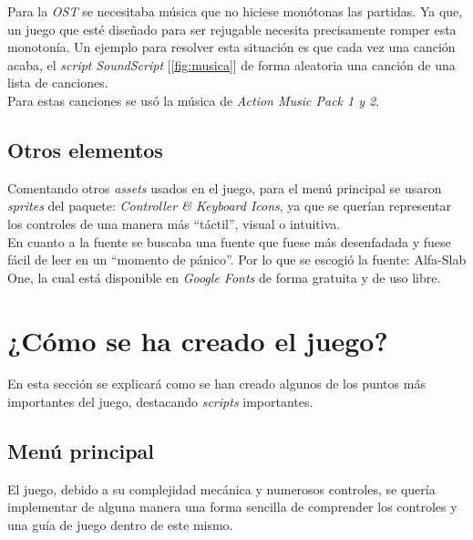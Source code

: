 \documentclass[11pt]{article}
\begin{document}
        Para la \textit{OST} se necesitaba música que no hiciese monótonas las partidas. Ya que, un juego que esté diseñado para ser rejugable necesita precisamente romper esta monotonía. Un ejemplo para resolver esta situación es que cada vez una canción acaba, el \textit{script} \textit{Sound\textit{Script}} [\ref{fig:musica}] de forma aleatoria una canción de una lista de canciones.\\
        
        Para estas canciones se usó la música de \textit{Action Music Pack 1 y 2}.\\
        
    \subsection{Otros elementos}
    
        Comentando otros \textit{assets} usados en el juego, para el menú principal se usaron \textit{\textit{sprite}s} del paquete: \textit{Controller \& Keyboard Icons}, ya que se querían representar los controles de una manera más “táctil”, visual o intuitiva.\\
        
        En cuanto a la fuente se buscaba una fuente que fuese más desenfadada y fuese fácil de leer en un “momento de pánico”. Por lo que se escogió la fuente: Alfa-Slab One, la cual está disponible en \textit{Google Fonts} de forma gratuita y de uso libre.\\

\newpage
\section{¿Cómo se ha creado el juego?}
    En esta sección se explicará como se han creado algunos de los puntos más importantes del juego, destacando \textit{scripts} importantes.
    \subsection{Menú principal}
        El juego, debido a su complejidad mecánica y numerosos controles, se quería implementar de alguna manera una forma sencilla de comprender los controles y una guía de juego dentro de este mismo.\\
\end{document}
